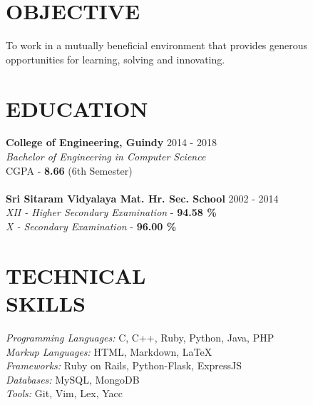 \documentclass[margin, 10pt]{res} %
\begin{document}
\begin{resume}
\section{OBJECTIVE}
To work in a mutually beneficial environment that provides generous opportunities for learning, solving and innovating.
\section{EDUCATION}
{\bf College of Engineering, Guindy} \hfill 2014 - 2018 \\
{\sl Bachelor of Engineering in Computer Science} \\
{CGPA - \textbf{8.66} (6th Semester)} \\
\\
{\bf Sri Sitaram Vidyalaya Mat. Hr. Sec. School} \hfill 2002 - 2014 \\
{\sl XII - Higher Secondary Examination} - {\textbf{94.58 \%}} \\
{\sl X - Secondary Examination} - {\textbf{96.00 \%}}
\section{TECHNICAL \\ SKILLS} 
{\sl Programming Languages:} C, C++, Ruby, Python, Java, PHP \\
{\sl Markup Languages:} HTML, Markdown, LaTeX \\
{\sl Frameworks:} Ruby on Rails, Python-Flask, ExpressJS \\
{\sl Databases:} MySQL, MongoDB \\
{\sl Tools:} Git, Vim, Lex, Yacc

\end{resume}
\end{document}

